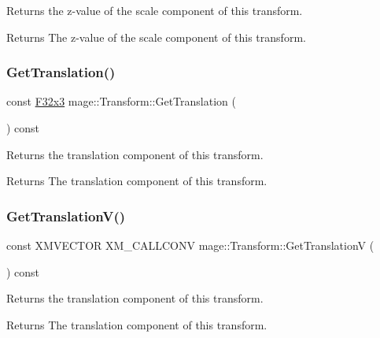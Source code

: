 Returns the z-\/value of the scale component of this transform.

\begin{DoxyReturn}{Returns}
The z-\/value of the scale component of this transform. 
\end{DoxyReturn}
\hypertarget{classmage_1_1_transform_a2e41df945ad4679a4e0ca021d4f8750b}{}\label{classmage_1_1_transform_a2e41df945ad4679a4e0ca021d4f8750b} 
\subsubsection{\texorpdfstring{Get\+Translation()}{GetTranslation()}}
{\footnotesize\ttfamily const \hyperlink{namespacemage_a73fbe0da4b8d5bc156bb8453e5b63a17}{F32x3} mage\+::\+Transform\+::\+Get\+Translation (\begin{DoxyParamCaption}{ }\end{DoxyParamCaption}) const\hspace{0.3cm}{\ttfamily [noexcept]}}

Returns the translation component of this transform.

\begin{DoxyReturn}{Returns}
The translation component of this transform. 
\end{DoxyReturn}
\hypertarget{classmage_1_1_transform_a2528e3f6ee97c90966393a8dc365ec05}{}\label{classmage_1_1_transform_a2528e3f6ee97c90966393a8dc365ec05} 
\subsubsection{\texorpdfstring{Get\+Translation\+V()}{GetTranslationV()}}
{\footnotesize\ttfamily const X\+M\+V\+E\+C\+T\+OR X\+M\+\_\+\+C\+A\+L\+L\+C\+O\+NV mage\+::\+Transform\+::\+Get\+TranslationV (\begin{DoxyParamCaption}{ }\end{DoxyParamCaption}) const\hspace{0.3cm}{\ttfamily [noexcept]}}

Returns the translation component of this transform.

\begin{DoxyReturn}{Returns}
The translation component of this transform. 
\end{DoxyReturn}
\hypertarget{classmage_1_1_transform_a90b2c059a45964bf4de816a4b7e6c55c}{}\label{classmage_1_1_transform_a90b2c059a45964bf4de816a4b7e6c55c} 
